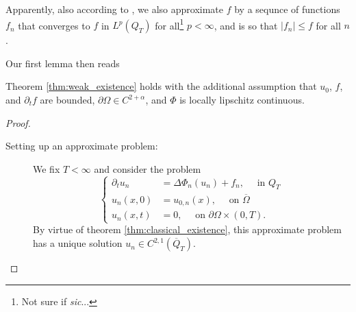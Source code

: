 \documentclass[11pt, a4paper]{article}
\begin{document}
Apparently, also according to \citep{vazquez2007porous}, we also approximate $f$ by a sequnce of functions $f_n$ that converges to $f$ in $L^p(Q_T)$ for all\footnote{Not sure if \textit{sic}...} $p<\infty$, and is so that $|f_n| \leq f$ for all $n$.

Our first lemma then reads
\begin{lemma}
Theorem \ref{thm:weak_existence} holds with the additional assumption that $u_0$, $f$, and $\partial_t f$ are bounded, $\partial \Omega \in C^{2+\alpha}$, and $\Phi$ is locally lipschitz continuous.
\end{lemma}

\begin{proof}

\begin{description}
	\item[Setting up an approximate problem:] We fix $T<\infty$ and consider the problem
		\begin{equation}
		\label{approximate_problem}
			\begin{cases}
			\partial_t u_n &= \Delta\Phi_n(u_n) + f_n, \quad \text{ in } Q_T \\
			u_n(x,0) &= u_{0,n}(x),	\quad \text{ on } \overline{\Omega} \\
			u_n(x,t) &= 0, \quad \text{ on }  \partial \Omega \times (0,T).
			\end{cases}
		\end{equation}			
	By virtue of theorem \ref{thm:classical_existence}, this approximate problem has a unique solution $u_n \in C^{2,1}(\overline{Q}_T)$.
	

\end{description}
\end{proof}
\end{document}

